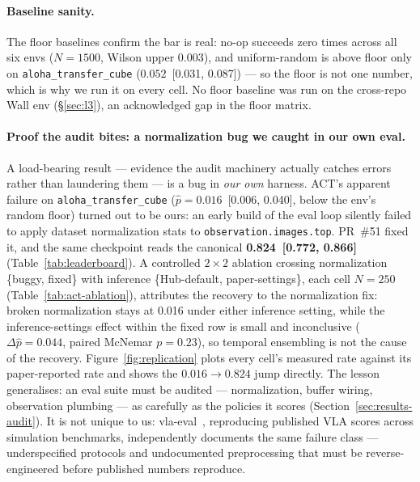 \documentclass[10pt]{article}
\begin{document}
\paragraph{Baseline sanity.}
The floor baselines confirm the bar is real:
no-op succeeds zero times across all six envs ($N{=}1500$, Wilson upper
$0.003$), and uniform-random is above floor only on
\texttt{aloha\_transfer\_cube} ($0.052$~[0.031, 0.087]) --- so the floor
is not one number, which is why we run it on every cell. No floor baseline
was run on the cross-repo Wall env (\S\ref{sec:l3}), an acknowledged gap
in the floor matrix.

\paragraph{Proof the audit bites: a normalization bug we caught in our
own eval.}
A load-bearing result --- evidence the audit machinery
actually catches errors rather than laundering them --- is a bug in
\emph{our own} harness. ACT's apparent failure on
\texttt{aloha\_transfer\_cube} ($\hat{p}{=}0.016$~[0.006, 0.040], below
the env's random floor) turned out to be ours: an early
build of the eval loop silently failed to apply dataset normalization stats
to \texttt{observation.images.top}. PR~\#51 fixed it, and the
same checkpoint reads the canonical \textbf{0.824~[0.772, 0.866]}
(Table~\ref{tab:leaderboard}). A
controlled $2{\times}2$ ablation crossing normalization \{buggy, fixed\}
with inference \{Hub-default, paper-settings\}, each cell $N{=}250$
(Table~\ref{tab:act-ablation}), attributes the recovery to the
normalization fix: broken normalization stays at 0.016 under either
inference setting, while the inference-settings effect within the fixed
row is small and inconclusive ($\Delta\hat{p}{=}0.044$, paired
McNemar $p{=}0.23$), so temporal ensembling
is not the cause of the recovery. Figure~\ref{fig:replication}
plots every cell's measured rate against its paper-reported rate and shows
the $0.016\to0.824$ jump directly. The lesson
generalises: an eval suite must be audited --- normalization,
buffer wiring, observation plumbing --- as carefully as the policies it
scores (Section~\ref{sec:results-audit}). It is not unique to us:
vla-eval~\cite{choi2026vlaeval}, reproducing published VLA scores across
simulation benchmarks, independently documents the same failure class ---
underspecified protocols and undocumented preprocessing that must be
reverse-engineered before published numbers reproduce.
\end{document}
